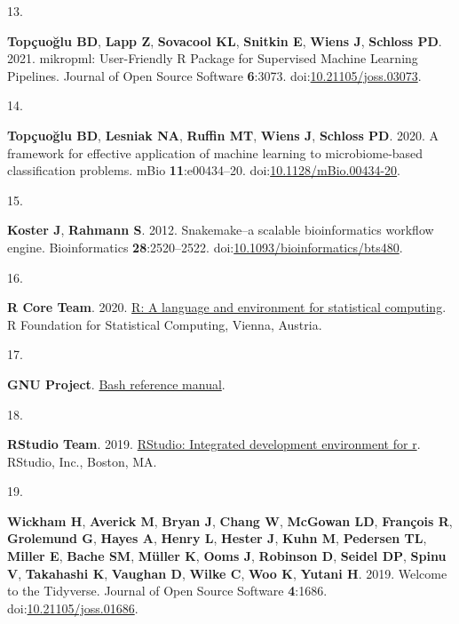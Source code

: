 \documentclass[
]{article}
\newlength{\cslhangindent}
\newlength{\csllabelwidth}
\newlength{\cslentryspacingunit} %
\newenvironment{CSLReferences}[2] %
 {%
  \setlength{\parindent}{0pt}
  \ifodd #1
  \let\oldpar\par
  \def\par{\hangindent=\cslhangindent\oldpar}
  \fi
  \setlength{\parskip}{#2\cslentryspacingunit}
 }%
 {}
\newcommand{\CSLLeftMargin}[1]{\parbox[t]{\csllabelwidth}{#1}}
\newcommand{\CSLRightInline}[1]{\parbox[t]{\linewidth - \csllabelwidth}{#1}\break}
\begin{document}
\begin{CSLReferences}{0}{1}
\leavevmode{}%
\CSLLeftMargin{13. }%
\CSLRightInline{\textbf{Topçuoğlu BD}, \textbf{Lapp Z}, \textbf{Sovacool
KL}, \textbf{Snitkin E}, \textbf{Wiens J}, \textbf{Schloss PD}. 2021.
mikropml: User-Friendly R Package for Supervised Machine Learning
Pipelines. Journal of Open Source Software \textbf{6}:3073.
doi:\href{https://doi.org/10.21105/joss.03073}{10.21105/joss.03073}.}

\leavevmode{}%
\CSLLeftMargin{14. }%
\CSLRightInline{\textbf{Topçuoğlu BD}, \textbf{Lesniak NA},
\textbf{Ruffin MT}, \textbf{Wiens J}, \textbf{Schloss PD}. 2020. A
framework for effective application of machine learning to
microbiome-based classification problems. mBio \textbf{11}:e00434--20.
doi:\href{https://doi.org/10.1128/mBio.00434-20}{10.1128/mBio.00434-20}.}

\leavevmode{}%
\CSLLeftMargin{15. }%
\CSLRightInline{\textbf{Koster J}, \textbf{Rahmann S}. 2012.
Snakemake--a scalable bioinformatics workflow engine. Bioinformatics
\textbf{28}:2520--2522.
doi:\href{https://doi.org/10.1093/bioinformatics/bts480}{10.1093/bioinformatics/bts480}.}

\leavevmode{}%
\CSLLeftMargin{16. }%
\CSLRightInline{\textbf{R Core Team}. 2020.
\href{https://www.R-project.org/}{R: A language and environment for
statistical computing}. R Foundation for Statistical Computing, Vienna,
Austria.}

\leavevmode{}%
\CSLLeftMargin{17. }%
\CSLRightInline{\textbf{GNU Project}.
\href{https://www.gnu.org/software/bash/\%20manual/bash.html/}{Bash
reference manual}.}

\leavevmode{}%
\CSLLeftMargin{18. }%
\CSLRightInline{\textbf{RStudio Team}. 2019.
\href{http://www.rstudio.com/}{RStudio: Integrated development
environment for r}. RStudio, Inc., Boston, MA.}

\leavevmode{}%
\CSLLeftMargin{19. }%
\CSLRightInline{\textbf{Wickham H}, \textbf{Averick M}, \textbf{Bryan
J}, \textbf{Chang W}, \textbf{McGowan LD}, \textbf{François R},
\textbf{Grolemund G}, \textbf{Hayes A}, \textbf{Henry L}, \textbf{Hester
J}, \textbf{Kuhn M}, \textbf{Pedersen TL}, \textbf{Miller E},
\textbf{Bache SM}, \textbf{Müller K}, \textbf{Ooms J}, \textbf{Robinson
D}, \textbf{Seidel DP}, \textbf{Spinu V}, \textbf{Takahashi K},
\textbf{Vaughan D}, \textbf{Wilke C}, \textbf{Woo K}, \textbf{Yutani H}.
2019. Welcome to the Tidyverse. Journal of Open Source Software
\textbf{4}:1686.
doi:\href{https://doi.org/10.21105/joss.01686}{10.21105/joss.01686}.}


\end{CSLReferences}
\end{document}

